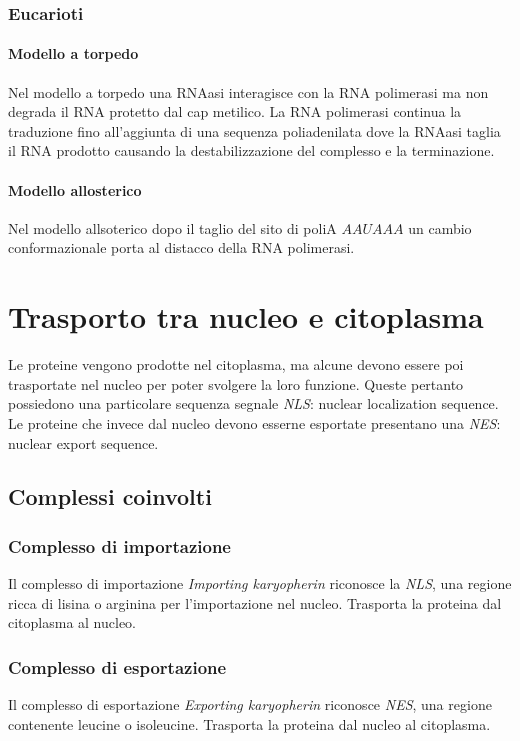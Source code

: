 		\subsubsection{Eucarioti}

			\paragraph{Modello a torpedo}
			Nel modello a torpedo una RNAasi interagisce con la RNA polimerasi ma non degrada il RNA protetto dal cap metilico.
			La RNA polimerasi continua la traduzione fino all'aggiunta di una sequenza poliadenilata dove la RNAasi taglia il RNA prodotto causando la destabilizzazione del complesso e la terminazione.

			\paragraph{Modello allosterico}
			Nel modello allsoterico dopo il taglio del sito di poliA $AAUAAA$ un cambio conformazionale porta al distacco della RNA polimerasi.


\section{Trasporto tra nucleo e citoplasma}
Le proteine vengono prodotte nel citoplasma, ma alcune devono essere poi trasportate nel nucleo per poter svolgere la loro funzione.
Queste pertanto possiedono una particolare sequenza segnale \emph{NLS}: nuclear localization sequence.
Le proteine che invece dal nucleo devono esserne esportate presentano una \emph{NES}: nuclear export sequence.

	\subsection{Complessi coinvolti}

		\subsubsection{Complesso di importazione}
		Il complesso di importazione \emph{Importing karyopherin} riconosce la \emph{NLS}, una regione ricca di lisina o arginina per l'importazione nel nucleo.
		Trasporta la proteina dal citoplasma al nucleo.

		\subsubsection{Complesso di esportazione}
		Il complesso di esportazione \emph{Exporting karyopherin} riconosce \emph{NES}, una regione contenente leucine o isoleucine.
		Trasporta la proteina dal nucleo al citoplasma.

